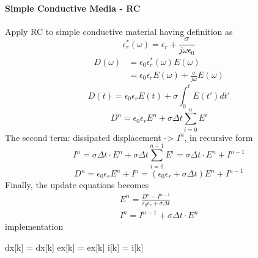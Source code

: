 \paragraph{\msjh Simple Conductive Media - RC}
Apply RC to simple conductive material having definition as
\begin{displaymath}
  \epsilon_r^{*}(\omega) = \epsilon_r + \frac{\sigma}{j \omega \epsilon_0}
\end{displaymath}
\begin{displaymath}
  \begin{split}
    D(\omega) & = \epsilon_0 \epsilon_r^{*}(\omega) E(\omega)\\
    & = \epsilon_0 \epsilon_r E(\omega) + \frac{\sigma}{j\omega}E(\omega)
  \end{split}
\end{displaymath}
\begin{displaymath}
  D(t) = \epsilon_0 \epsilon_rE(t) + \sigma \int_0^t E(t')dt'
\end{displaymath}
\begin{displaymath}
    D^n = \epsilon_0 \epsilon_r E^n + \sigma \Delta t \sum_{i=0}^{n}E^i
\end{displaymath}
The second term: dissipated displacement -> $I^n$, in recursive form
\begin{equation}
  I^n = \sigma\Delta t\cdot E^n + \sigma\Delta t\sum_{i=0}^{n-1}E^i = \sigma\Delta t\cdot E^n + I^{n-1}
\end{equation}
\begin{equation}
    D^n = \epsilon_0 \epsilon_r E^n + I^n = (\epsilon_0 \epsilon_r + \sigma \Delta t) E^n + I^{n-1}
\end{equation}
Finally, the update equations becomes
\begin{gather*}
  E^n = \frac{D^n - I^{n-1}}{\epsilon_0 \epsilon_r + \sigma \Delta t}\\
  I^n = I^{n-1} + \sigma \Delta t\cdot E^n
\end{gather*}
implementation
\begin{code}
  dx[k] = dx[k]
  ex[k] = ex[k]
  i[k]  = i[k]
\end{code}



